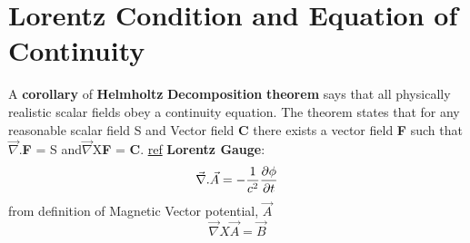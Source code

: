 \documentclass[11pt, a4paper]{article}
\begin{document}
\section{Lorentz Condition and Equation of Continuity}
A \textbf{corollary}  of \textbf{Helmholtz} \textbf{Decomposition} \textbf{theorem} says that all physically realistic scalar fields obey a continuity equation. The theorem states that for any reasonable scalar field S and Vector field \textbf{C}  there exists a vector field \textbf{F} such that \(\vec{\nabla}\).\textbf{F} = S and\(\vec{\nabla}\)X\textbf{F} = \textbf{C}. \href{http://dfcd.net/articles/potentialfields.pdf}{ref}\newline
\textbf{Lorentz Gauge}: 
\begin{gather}
    \vec{\nabla}.\vec{A} = -\frac{1}{c^2}\pdv{\phi}{t}
\end{gather}
from definition  of Magnetic Vector potential, \(\vec{A}\)
\begin{equation}
    \vec{\nabla}X\vec{A} = \vec{B}
\end{equation} 
\end{document}
